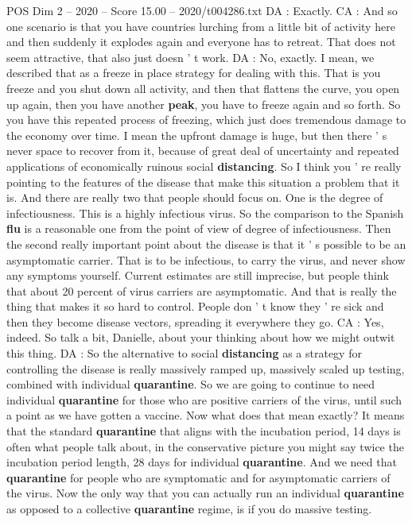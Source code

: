 \begin{textsample}{POS Dim 2 – 2020 – Score 15.00 – 2020/t004286.txt}
DA : Exactly.
CA : And so one scenario is that you have countries lurching from a little bit of activity here and then suddenly it explodes again and everyone has to retreat.
That does not seem attractive, that also just doesn ' t work.
DA : No, exactly.
I mean, we described that as a freeze in place strategy for dealing with this.
That is you freeze and you shut down all activity, and then that flattens the curve, you open up again, then you have another \textbf{peak}, you have to freeze again and so forth.
So you have this repeated process of freezing, which just does tremendous damage to the economy over time.
I mean the upfront damage is huge, but then there ' s never space to recover from it, because of great deal of uncertainty and repeated applications of economically ruinous social \textbf{distancing}.
So I think you ' re really pointing to the features of the disease that make this situation a problem that it is.
And there are really two that people should focus on.
One is the degree of infectiousness.
This is a highly infectious virus.
So the comparison to the Spanish \textbf{flu} is a reasonable one from the point of view of degree of infectiousness.
Then the second really important point about the disease is that it ' s possible to be an asymptomatic carrier.
That is to be infectious, to carry the virus, and never show any symptoms yourself.
Current estimates are still imprecise, but people think that about 20 percent of virus carriers are asymptomatic.
And that is really the thing that makes it so hard to control.
People don ' t know they ' re sick and then they become disease vectors, spreading it everywhere they go.
CA : Yes, indeed.
So talk a bit, Danielle, about your thinking about how we might outwit this thing.
DA : So the alternative to social \textbf{distancing} as a strategy for controlling the disease is really massively ramped up, massively scaled up testing, combined with individual \textbf{quarantine}.
So we are going to continue to need individual \textbf{quarantine} for those who are positive carriers of the virus, until such a point as we have gotten a vaccine.
Now what does that mean exactly?
It means that the standard \textbf{quarantine} that aligns with the incubation period, 14 days is often what people talk about, in the conservative picture you might say twice the incubation period length, 28 days for individual \textbf{quarantine}.
And we need that \textbf{quarantine} for people who are symptomatic and for asymptomatic carriers of the virus.
Now the only way that you can actually run an individual \textbf{quarantine} as opposed to a collective \textbf{quarantine} regime, is if you do massive testing.

\end{textsample}
